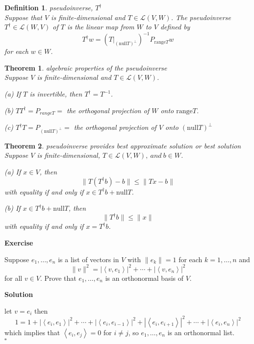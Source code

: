 \documentclass{article}
\newtheorem{theorem}{Theorem}[subsection]
\newtheorem{definition}{Definition}[subsection]
\newenvironment{exercise}{%
{\textbf{Exercise\\}
    }
}{
}
\newenvironment{solution}{%
{
    \textbf{Solution\\}
    }
}{
  \hfill $\square$ 
  \par\bigskip 
}
\newcommand{\range}{\text{range}}
\newcommand{\n}{\text{null}}
\begin{document}
\begin{CJK}{UTF8}{gkai}
\begin{definition}
    pseudoinverse, $T^\dagger$ \\

    Suppose that $V$ is finite-dimensional and $T \in \mathcal{L}(V,W)$. The pseudoinverse $T^\dagger  \in\mathcal{L}(W,V)$ of $T$ is the linear map from $W$ to $V$ defined by
    \[T^\dagger w =(T|_{(\n T)^\bot})^{-1} P_{\range T} w\]
    for each $w \in W$.
\end{definition}

\begin{theorem}
    algebraic properties of the pseudoinverse\\

    Suppose $V$ is finite-dimensional and $T \in \mathcal{L}(V,W)$.

    (a) If $T$ is invertible, then $T^\dagger = T^{-1}$.

    (b) $T T^\dagger  = P_{rangeT} =$ the orthogonal projection of $W$ onto $\range T$.

    (c) $T^\dagger T = P_{(\n T)^\bot} =$ the orthogonal projection of $V$ onto $(\n T)^\bot$\\
\end{theorem}

\begin{theorem}
    pseudoinverse provides best approximate solution or best solution\\

    Suppose $V$ is finite-dimensional, $T \in \mathcal{L}(V,W), ~and~ b \in W$.

    (a) If $x \in V$, then
    \[\|T(T^\dagger b) -  b\|  \leq \|Tx - b\| \]
    with equality if and only if $x \in T^\dagger b + \n T$.

    (b) If $x \in T^\dagger b+ \n T$, then
    \[\|T^\dagger b\| \leq \|x\|\]
    with equality if and only if $x = T^\dagger b$.
\end{theorem}

\begin{exercise}
    Suppose $e_1,\ldots,e_n$ is a list of vectors in $V$ with $\|e_k\| = 1$ for each $k = 1,\ldots,n$
    and
    \[\|v\|^2 = |\left<v,e_1\right>|^2 + \cdots + |\left<v,e_n\right>|^2\]
    for all $v \in V$. Prove that $e_1,\ldots,e_n$ is an orthonormal basis of $V$.
\end{exercise}

\begin{solution}
    let $v = e_i$ then
    \[1 = 1 + |\left<e_i,e_1\right>|^2 +\cdots +  |\left<e_i,e_{i - 1}\right>|^2 + |\left<e_i,e_{i + 1}\right>|^2 +\cdots + |\left<e_i,e_n\right>|^2 \]
    which implies that $\left<e_i,e_j\right> = 0$ for $i \neq j$, so $e_1,\ldots,e_n$ is an orthonormal list.\\


\end{solution}
\end{CJK}
\end{document}

